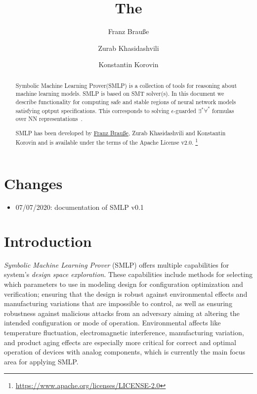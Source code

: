 \documentclass[a4paper,parskip=half]{article} %
\title{The \Solver}
\author{%
	Franz Brauße \and
	Zurab Khasidashvili \and
	Konstantin Korovin
}
\newcommand*\Solver{Symbolic Machine Learning Prover\xspace}
\newcommand*\SolverAbbrvText{SMLP}
\newcommand*\SolverAbbrv{\SolverAbbrvText\xspace}
\begin{document}
\maketitle
\begin{abstract}


\Solver (\SolverAbbrv) is a collection of tools for reasoning about machine
learning models. \SolverAbbrv is based on SMT solver(s). In this document we
describe functionality for computing safe and stable regions of neural network
models satisfying optput specifications. This corresponds to solving
$\epsilon$-guarded $\exists^*\forall^*$ formulas over NN
representations~\cite{BKK20}.


\SolverAbbrv has been developed by
\href{mailto:brausse@informatik.uni-trier.de?subject=\SolverAbbrvText}{Franz Brauße},
Zurab Khasidashvili
and Konstantin Korovin and is available
under the terms of the Apache License v2.0.%
\footnote{\url{https://www.apache.org/licenses/LICENSE-2.0}}
\end{abstract}
\tableofcontents

\section{Changes}
\begin{itemize}
\item 07/07/2020: documentation of \SolverAbbrv v0.1
\end{itemize}

\section{Introduction}

\emph{Symbolic Machine Learning Prover} (SMLP) offers multiple capabilities for system's \emph{design space exploration}.
These capabilities include methods for selecting which parameters to use in modeling design for configuration optimization and verification;
ensuring that the design is robust against environmental effects and manufacturing variations that are impossible to control, as well as ensuring 
robustness against malicious attacks from an adversary aiming at altering the intended configuration or mode of operation.
Environmental affects like temperature fluctuation, electromagnetic interference, manufacturing variation, and product aging effects are especially 
more critical for correct and optimal operation of devices with analog components, which is currently the main focus area for applying  SMLP.
\end{document}

